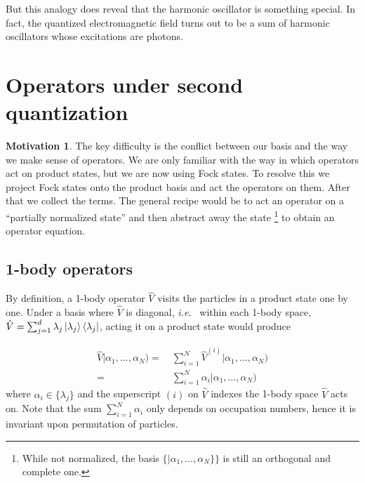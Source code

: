 \documentclass{article}
\theoremstyle{definition}
\newtheorem{mot}{Motivation}[section]
\theoremstyle{plain}
\numberwithin{equation}{section}
\begin{document}
But this analogy does reveal that 
the harmonic oscillator is something special. 
In fact, the quantized electromagnetic field 
turns out to be a sum of harmonic oscillators 
whose excitations are photons.

\section{Operators under second quantization}

\begin{mot}
    The key difficulty is the conflict between our basis 
    and the way we make sense of operators. We are only familiar 
    with the way in which operators act on product states, but 
    we are now using Fock states.    
    To resolve this 
    we project Fock states onto the product basis 
    and act the operators on them. After that we 
    collect the terms. The general recipe would be 
    to act an operator on a 
    ``partially normalized state'' 
    and then abstract away the state 
    \footnote{
        While not normalized, the basis 
        $\{ |\alpha_1, \ldots ,\alpha_{N}\} \}$
        is still an orthogonal and complete one.
    }
    to obtain an operator equation.
\label{mot:operators-under-second-quantization}
\end{mot}

\subsection{1-body operators}

By definition, a 1-body operator $\hat{V}$ visits 
the particles in a product state one by one. 
Under a basis where $\hat{V}$ is diagonal, \textit{i.e.}~
within each 1-body space, 
$\hat{V}
=
\sum_{j=1}^{d}\lambda_{j} 
\ket{\lambda_{j}}
\bra{\lambda_{j}}
$, acting it on a product state would produce 

\begin{align*}
    \hat{V}
    |\alpha_1, \ldots ,\alpha_{N})
    =&\ 
    \sum_{i = 1}^{N}
    \hat{V}^{(i)}
    |\alpha_1, \ldots ,\alpha_{N}) \\
    =&\ 
    \sum_{i = 1}^{N}
    \alpha_{i}
    |\alpha_1, \ldots ,\alpha_{N})
\end{align*}
where $\alpha_{i}\in \{\lambda_{j}\}$ and 
the superscript $(i)$ on $\hat{V}$ 
indexes the 1-body space $\hat{V}$ acts on. 
Note that the sum $\sum_{i=1}^{N}\alpha_{i}$ 
only depends on occupation numbers, hence 
it is invariant upon permutation of particles.
\end{document}

